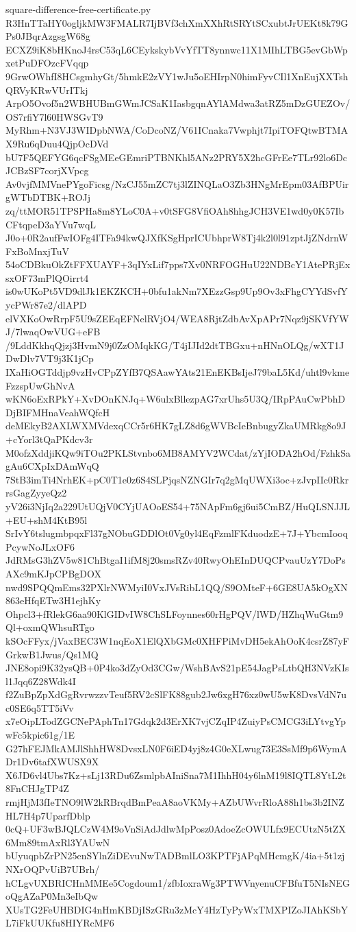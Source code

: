 \documentclass[11pt]{article}
\theoremstyle{definition}
\theoremstyle{remark}
\begin{document}
\begin{filecontents*}[overwrite]{square-difference-free-certificate.py}
R3HnTTaHY0ogljkMW3FMALR7IjBVf3chXmXXhRtSRYtSCxubtJrUEKt8k79GPs0JBqrAzgsgW68g
ECXZ9iK8bHKnoJ4rsC53qL6CEykskybVvYfTT8ynnwc11X1MIhLTBG5evGbWpxetPuDFOzcFVqqp
9GrwOWhfI8HCsgmhyGt/5hmkE2zVY1wJu5oEHIrpN0himFyvCIl1XnEujXXTshQRVyKRwVUrITkj
ArpO5Ovof5n2WBHUBmGWmJCSaK1IasbgqnAYlAMdwa3atRZ5mDzGUEZOv/OS7rfiY7l60HWSGvT9
MyRhm+N3VJ3WIDpbNWA/CoDcoNZ/V61ICnaka7Vwphjt7IpiTOFQtwBTMAX9Ru6qDuu4QjpOcDVd
bU7F5QEFYG6qcFSgMEeGEmriPTBNKhl5ANz2PRY5X2hcGFrEe7TLr92lo6DcJCBzSF7corjXVpcg
Av0vjfMMVnePYgoFicsg/NzCJ55mZC7tj3lZINQLaO3Zb3HNgMrEpm03AfBPUirgWTbDTBK+ROJj
zq/ttMOR51TPSPHa8m8YLoC0A+v0tSFG8VfiOAh8hhgJCH3VE1wd0y0K57IbCFtqpeD3aYVu7wqL
J0o+0R2aufFwIOFg4ITFa94kwQJXfKSgHprICUbhprW8Tj4k2l0l91zptJjZNdrnWFxBoMnxjTuV
54oCDBkuOkZtFFXUAYF+3qIYxLif7pps7Xv0NRFOGHuU22NDBcY1AtePRjExsxOF73mPlQOirrt4
is0wUKoPt5VD9dlJk1EKZKCH+0bfu1akNm7XEzzGsp9Up9Ov3xFhgCYYdSvfYycPWr87e2/dlAPD
elVXKoOwRrpF5U9sZEEqEFNelRVjO4/WEA8RjtZdbAvXpAPr7Nqz9jSKVfYWJ/7lwaqOwVUG+eFB
/9LddKkhqQjzj3HvmN9j0ZzOMqkKG/T4jIJId2dtTBGxu+nHNnOLQg/wXT1JDwDlv7VT9j3K1jCp
IXaHiOGTddjp9vzHvCPpZYfB7QSAawYAts21EnEKBsIjeJ79baL5Kd/uhtl9vkmeFzzspUwGhNvA
wKN6oExRPkY+XvDOnKNJq+W6ulxBllezpAG7xrUhs5U3Q/IRpPAuCwPbhDDjBIFMHnaVeahWQfcH
deMEkyB2AXLWXMVdexqCCr5r6HK7gLZ8d6gWVBcIeBnbugyZkaUMRkg8o9J+cYorl3tQaPKdcv3r
M0ofzXddjiKQw9iTOu2PKLStvnbo6MB8AMYV2WCdat/zYjIODA2hOd/FzhkSagAu6CXpIxDAmWqQ
7StB3imTi4NrhEK+pC0T1e0z6S4SLPjqsNZNGIr7q2gMqUWXi3oc+zJvpIIc0RkrrsGagZyyeQz2
yV26i3NjIq2a229UtUQjV0CYjUAOoES54+75NApFm6gj6ui5CmBZ/HuQLSNJJL+EU+shM4KtB95l
SrIvY6tslugmbpqxFl37gNObuGDDlOt0Vg0yl4EqFzmlFKduodzE+7J+YbcmIooqPcywNoJLxOF6
JdRMsG3hZV5w81ChBtgaI1ifM8j20smsRZv40RwyOhEInDUQCPvauUzY7DoPsAXc9mKJpCPBgDOX
nwd9SPQQmEms32PXlrNWMyiI0VxJVsRibL1QQ/S9OMteF+6GE8UA5kOgXN863eHfqETw3H1ejhKy
Ohpcl3+fRlekG6aa90KlGIDvIW8ChSLFoynnes60rHgPQV/lWD/HZhqWuGtm9Ql+oxmQWhsuRTgo
kSOcFFyx/jVaxBEC3W1nqEoX1ElQXbGMc0XHFPiMvDH5ekAhOoK4csrZ87yFGrkwB1Jwus/Qs1MQ
JNE8opi9K32ysQB+0P4ko3dZyOd3CGw/WshBAvS21pE54JagPsLtbQH3NVzKIsl1Jqq6Z28Wdk4I
f2ZuBpZpXdGgRvrwzzvTeuf5RV2cSlFK88gub2Jw6xgH76xz0wU5wK8DvsVdN7uc0SE6q5TT5iVv
x7eOipLTodZGCNePAphTn17Gdqk2d3ErXK7vjCZqIP4ZuiyPsCMCG3iLYtvgYpwFc5kpic61g/1E
G27hFEJMkAMJlShhHW8DvsxLN0F6iED4yj8z4G0eXLwug73E3SsMf9p6WymADr1Dv6tafXWUSX9X
X6JD6vl4Ubs7Kz+sLj13RDu6ZsmlpbAIniSna7M1IhhH04y6lnM19l8IQTL8YtL2t8FnCHJgTP4Z
rmjHjM3fIeTNO9lW2kRBrqdBmPeaA8aoVKMy+AZbUWvrRloA88h1bs3b2INZHL7H4p7UparfDblp
0cQ+UF3wBJQLCzW4M9oVnSiAdJdlwMpPosz0AdoeZcOWULfx9ECUtzN5tZX6Mm89tmAxRl3YAUwN
bUyuqpbZrPN25enSYlnZiDEvuNwTADBmlLO3KPTFjAPqMHcmgK/4ia+5t1zjNXrOQPvUiB7UBrh/
hCLgvUXBRICHnMMEe5Cogdoum1/zfbIoxraWg3PTWVnyenuCFBfuT5NIsNEGoQgAZaP0Mn3eIbQw
XUsTG2FeUHBDIG4nHmKBDjISzGRu3zMcY4HzTyPyWxTMXPIZoJIAhKSbYL7iFkUUKfu8HIYRcMF6

\end{filecontents*}
\end{document}
